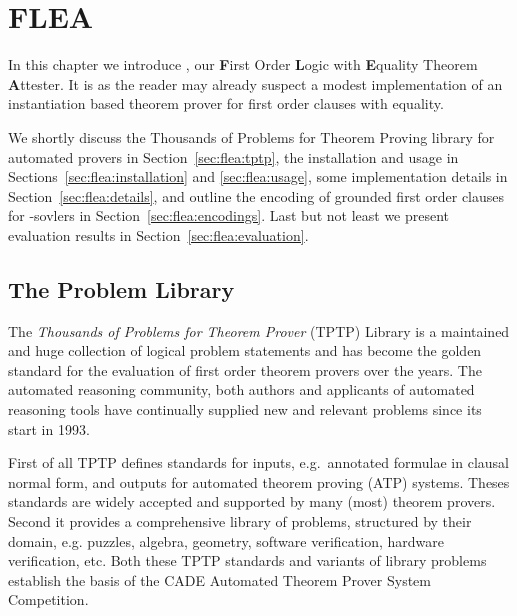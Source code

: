 
\chapter{FLEA}\label{chapter:flea}



In this chapter we introduce \FLEA{},
our
\textbf{F}irst Order \textbf{L}ogic with \textbf{E}quality Theorem \textbf{A}ttester.
It is
as the reader may already suspect
a modest implementation of an instantiation based theorem prover for first order clauses with equality. 

We shortly discuss the Thousands of Problems for Theorem Proving library for automated provers 
in Section~\vref{sec:flea:tptp},
the installation  and usage in 
Sections~\vref{sec:flea:installation} and \vref{sec:flea:usage},
some implementation details in Section~\vref{sec:flea:details}, 
and outline the encoding of grounded first order clauses for \SMT-sovlers in Section~\vref{sec:flea:encodings}. Last but not least we present evaluation results in Section~\vref{sec:flea:evaluation}. 


\section{The Problem Library}\label{sec:flea:tptp}

The \emph{Thousands of Problems for Theorem Prover} (TPTP) Library\cite{Sut17}
is a maintained and huge collection of logical problem statements and
has become the golden standard for the evaluation of first order theorem provers over the years.
The automated reasoning community, both authors and applicants of automated reasoning tools 
have continually supplied new and relevant problems since its start in 1993.

First of all TPTP defines standards for inputs, 
e.g.~annotated formulae in clausal normal form,
and outputs for automated theorem proving (ATP) systems. 
Theses standards are widely accepted and supported by many (most) theorem provers. 
Second it provides a comprehensive library of problems, structured by their domain,
e.g. puzzles, algebra, geometry, software verification, hardware verification, etc.
Both these TPTP standards and variants of library problems establish the basis of the CADE Automated Theorem Prover System Competition\cite{Sut16}.


